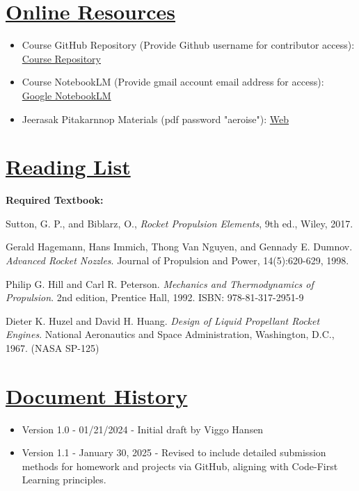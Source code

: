 \documentclass[12pt]{article}
\begin{document}
\section{\hyperref[sec:resources]{Online Resources}}
\label{sec:resources}
\begin{itemize}
    \item Course GitHub Repository (Provide Github username for contributor access): \href{https://github.com/vkhansen/rocket_propulsion.git}{Course Repository}
    \item Course NotebookLM (Provide gmail account email address for access): \href{https://notebooklm.google.com/notebook/c7f10837-5c21-46ee-af09-273d38bb41a3}{Google NotebookLM}
    \item Jeerasak Pitakarnnop Materials (pdf password "aeroise"): \href{https://pitakarnnop.wordpress.com/engineering-courses/rocket-propulsion}{Web}
\end{itemize}

\section{\hyperref[sec:reading]{Reading List}}
\label{sec:reading}
\textbf{Required Textbook:}\\
\vspace{1pt}

Sutton, G. P., and Biblarz, O., \textit{Rocket Propulsion Elements}, 9th ed., Wiley, 2017.

\begin{thebibliography}{9}
Gerald Hagemann, Hans Immich, Thong Van Nguyen, and Gennady E. Dumnov. \textit{Advanced Rocket Nozzles}. Journal of Propulsion and Power, 14(5):620-629, 1998.

Philip G. Hill and Carl R. Peterson. \textit{Mechanics and Thermodynamics of Propulsion}. 2nd edition, Prentice Hall, 1992. ISBN: 978-81-317-2951-9

Dieter K. Huzel and David H. Huang. \textit{Design of Liquid Propellant Rocket Engines}. National Aeronautics and Space Administration, Washington, D.C., 1967. (NASA SP-125)
\end{thebibliography}

\section{\hyperref[sec:history]{Document History}}
\label{sec:history}
\begin{itemize}
    \item Version 1.0 - 01/21/2024 - Initial draft by Viggo Hansen
    \item Version 1.1 - January 30, 2025 - Revised to include detailed submission methods for homework and projects via GitHub, aligning with Code-First Learning principles.
\end{itemize}
\end{document}
